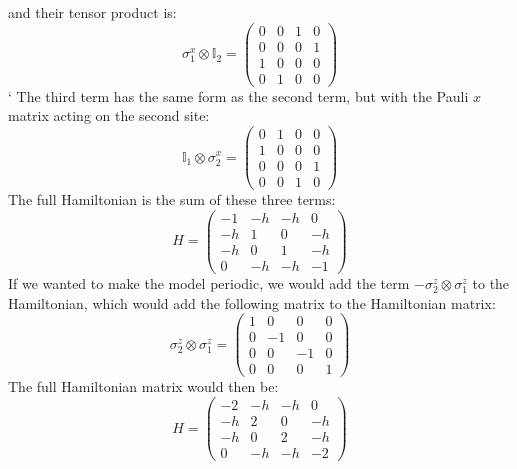 \documentclass[12pt]{article}
\begin{document}
and their tensor product is:
\begin{equation}
    \sigma_{1}^{x} \otimes \mathbb{I}_{2} = \begin{pmatrix} 0 & 0 & 1 & 0 \\ 0 & 0 & 0 & 1 \\ 1 & 0 & 0 & 0 \\ 0 & 1 & 0 & 0 \end{pmatrix}
\end{equation}`
The third term has the same form as the second term, but with the Pauli $x$ matrix acting on the second site:
\begin{equation}
    \mathbb{I}_{1} \otimes \sigma_{2}^{x} = \begin{pmatrix} 0 & 1 & 0 & 0 \\ 1 & 0 & 0 & 0 \\ 0 & 0 & 0 & 1 \\ 0 & 0 & 1 & 0 \end{pmatrix}
\end{equation}
The full Hamiltonian is the sum of these three terms:
\begin{equation}
    H = \begin{pmatrix} -1 & -h & -h & 0 \\ -h & 1 & 0 & -h \\ -h & 0 & 1 & -h \\ 0 & -h & -h & -1 \end{pmatrix}
\end{equation}
If we wanted to make the model periodic, we would add the term $-\sigma_{2}^{z} \otimes \sigma_{1}^{z}$ to the Hamiltonian, which would add the following matrix to the Hamiltonian matrix:
\begin{equation}
    \sigma_{2}^{z} \otimes \sigma_{1}^{z} = \begin{pmatrix} 1 & 0 & 0 & 0 \\ 0 & -1 & 0 & 0 \\ 0 & 0 & -1 & 0 \\ 0 & 0 & 0 & 1 \end{pmatrix}
\end{equation}
The full Hamiltonian matrix would then be:
\begin{equation}
    H = \begin{pmatrix} -2 & -h & -h & 0 \\ -h & 2 & 0 & -h \\ -h & 0 & 2 & -h \\ 0 & -h & -h & -2 \end{pmatrix}
\end{equation}
\end{document}

